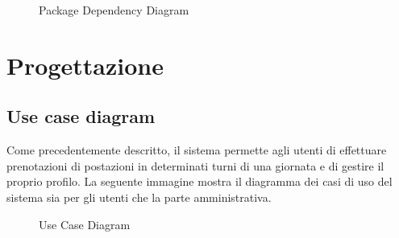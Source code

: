 \documentclass{article}
\begin{document}
            \begin{figure}[H]
                \centering
                \caption{Package Dependency Diagram}
                \label{fig:package-dependency-diagram}
            \end{figure}
\section{Progettazione}\label{sec:progettazione}
\subsection{Use case diagram}\label{subsec:use-case-diagram}
Come precedentemente descritto, il sistema permette agli utenti di effettuare prenotazioni di postazioni in determinati turni di una giornata e di gestire il proprio profilo. La seguente immagine mostra il diagramma dei casi di uso del sistema sia per gli utenti che la parte amministrativa. 
\clearpage
\begin{figure}%
                \centering
                \caption{Use Case Diagram}
                \label{fig:use-case-diagram}
            \end{figure}
\end{document}
